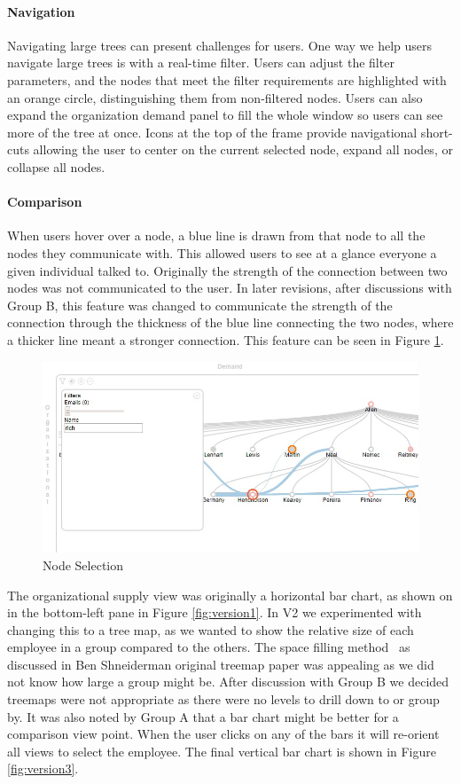 \documentclass[journal]{vgtc}                %
\begin{document}
\paragraph{Navigation}
Navigating large trees can present challenges for users.  One way we help users navigate large trees is with a real-time filter. Users can adjust the filter parameters, and the nodes that meet the filter requirements are highlighted with an orange circle, distinguishing them from non-filtered nodes.  Users can also expand the organization demand panel to fill the whole window so users can see more of the tree at once. Icons at the top of the frame provide navigational short-cuts allowing the user to center on the current selected node, expand all nodes, or collapse all nodes.

\paragraph{Comparison}
When users hover over a node, a blue line is drawn from that node to all the nodes they communicate with. This allowed users to see at a glance everyone a given individual talked to. Originally the strength of the connection between two nodes was not communicated to the user. In later revisions, after discussions with Group B, this feature was changed to communicate the strength of the connection through the thickness of the blue line connecting the two nodes, where a thicker line meant a stronger connection. This feature can be seen in Figure \ref{fig:node}.

\begin{figure}
	\centering
	\includegraphics[width=\columnwidth]{pictures/orgdemand.jpg}
	\caption{Node Selection}
	\label{fig:node}
\end{figure}

The organizational supply view was originally a horizontal bar chart, as shown on in the bottom-left pane in Figure \ref{fig:version1}.  In V2 we experimented with changing this to a tree map, as we wanted to show the relative size of each employee in a group compared to the others.  The space filling method~\cite{shneiderman1992tree} as discussed in Ben Shneiderman original treemap paper was appealing as we did not know how large a group might be.  After discussion with Group B we decided treemaps were not appropriate as there were no levels to drill down to or group by.  It was also noted by Group A that a bar chart might be better for a comparison view point.  When the user clicks on any of the bars it will re-orient all views to select the employee.  The final vertical bar chart is shown in Figure \ref{fig:version3}.
\end{document}
